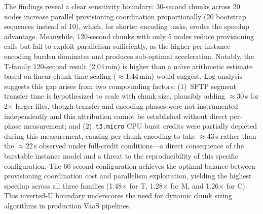 \documentclass[conference]{IEEEtran}
\begin{document}
The findings reveal a clear sensitivity boundary: 30-second chunks across 20 nodes increase parallel provisioning coordination proportionally (20 bootstrap sequences instead of 10), which, for shorter encoding tasks, erodes the speedup advantage. Meanwhile, 120-second chunks with only 5 nodes reduce provisioning calls but fail to exploit parallelism sufficiently, as the higher per-instance encoding burden dominates and produces sub-optimal acceleration. Notably, the T-family 120-second result (2.04\,min) is higher than a na\"{\i}ve arithmetic estimate based on linear chunk-time scaling ($\approx$1.44\,min) would suggest. Log analysis suggests this gap arises from two compounding factors: (1)~SFTP segment transfer time is hypothesized to scale with chunk size, plausibly adding $\approx$30\,s for 2$\times$ larger files, though transfer and encoding phases were not instrumented independently and this attribution cannot be established without direct per-phase measurement; and (2)~\texttt{t3.micro} CPU burst credits were partially depleted during this measurement, causing per-chunk encoding to take $\approx$43\,s rather than the $\approx$22\,s observed under full-credit conditions---a direct consequence of the burstable instance model and a threat to the reproducibility of this specific configuration. The 60-second configuration achieves the optimal balance between provisioning coordination cost and parallelism exploitation, yielding the highest speedup across all three families (1.48$\times$ for T, 1.28$\times$ for M, and 1.26$\times$ for C). This inverted-U boundary underscores the need for dynamic chunk sizing algorithms in production VaaS pipelines.
\end{document}
